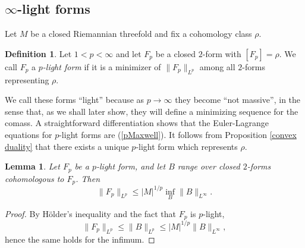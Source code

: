 \documentclass[reqno,11pt]{amsart}
\newcommand{\RR}{\mathbf{R}}
\newcommand{\dfn}[1]{\emph{#1}\index{#1}}
\newtheorem{lemma}[theorem]{Lemma}
\newtheorem{proposition}[theorem]{Proposition}
\theoremstyle{definition}
\newtheorem{definition}[theorem]{Definition}
\numberwithin{equation}{section}
\begin{document}
\subsection{\texorpdfstring{$\infty$-light forms}{Infinity-light forms}}
Let $M$ be a closed Riemannian threefold and fix a cohomology class $\rho$.

\begin{definition}
Let $1 < p < \infty$ and let $F_p$ be a closed $2$-form with $[F_p] = \rho$.
We call $F_p$ a \dfn{$p$-light form} if it is a minimizer of $\|F_p\|_{L^p}$ among all $2$-forms representing $\rho$.
\end{definition}

We call these forms ``light'' because as $p \to \infty$ they become ``not massive'', in the sense that, as we shall later show, they will define a minimizing sequence for the comass.
A straightforward differentiation shows that the Euler-Lagrange equations for $p$-light forms are (\ref{pMaxwell}).
It follows from Proposition \ref{convex duality} that there exists a unique $p$-light form which represents $\rho$.

\begin{lemma}
Let $F_p$ be a $p$-light form, and let $B$ range over closed $2$-forms cohomologous to $F_p$. Then
\begin{equation}\label{infinity magnetic rules p magnetic}
	\|F_p\|_{L^p} \leq |M|^{1/p} \inf_B \|B\|_{L^\infty}.
\end{equation}
\end{lemma}
\begin{proof}
By H\"older's inequality and the fact that $F_p$ is $p$-light,
$$\|F_p\|_{L^p} \leq \|B\|_{L^p} \leq |M|^{1/p} \|B\|_{L^\infty},$$
hence the same holds for the infimum.
\end{proof}


\end{document}
